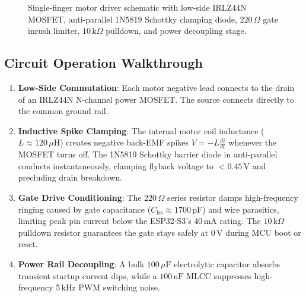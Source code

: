 \documentclass[10pt,twocolumn]{article}
\begin{document}
\begin{figure}[t]
\caption{Single-finger motor driver schematic with low-side IRLZ44N MOSFET, anti-parallel 1N5819 Schottky clamping diode, $220\,\Omega$ gate inrush limiter, $10\,\text{k}\Omega$ pulldown, and power decoupling stage.}
\label{fig:schematic}
\end{figure}

\subsection{Circuit Operation Walkthrough}
\begin{enumerate}
    \item \textbf{Low-Side Commutation}: Each motor negative lead connects to the drain of an IRLZ44N N-channel power MOSFET. The source connects directly to the common ground rail.
    \item \textbf{Inductive Spike Clamping}: The internal motor coil inductance ($L \approx 120\,\mu\text{H}$) creates negative back-EMF spikes $V = -L \frac{di}{dt}$ whenever the MOSFET turns off. The 1N5819 Schottky barrier diode in anti-parallel conducts instantaneously, clamping flyback voltage to $<0.45$\,V and precluding drain breakdown.
    \item \textbf{Gate Drive Conditioning}: The $220\,\Omega$ series resistor damps high-frequency ringing caused by gate capacitance ($C_{\text{iss}} \approx 1700$\,pF) and wire parasitics, limiting peak pin current below the ESP32-S3's 40\,mA rating. The $10\,\text{k}\Omega$ pulldown resistor guarantees the gate stays safely at 0\,V during MCU boot or reset.
    \item \textbf{Power Rail Decoupling}: A bulk $100\,\mu\text{F}$ electrolytic capacitor absorbs transient startup current dips, while a $100\,\text{nF}$ MLCC suppresses high-frequency 5\,kHz PWM switching noise.
\end{enumerate}
\end{document}
